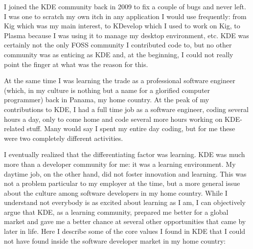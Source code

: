 

\noindent{}I joined the KDE community back in 2009 to fix a couple of bugs and
never left. I was one to scratch my own itch in any application I
would use frequently: from Kig which was my main interest, to KDevelop
which I used to work on Kig, to Plasma because I was using it to
manage my desktop environment, etc. KDE was certainly not the only
FOSS community I contributed code to, but no other community was as
enticing as KDE and, at the beginning, I could not really point the
finger at what was the reason for this.

At the same time I was learning the trade as a professional software
engineer (which, in my culture is nothing but a name for a glorified
computer programmer) back in Panama, my home country. At the peak of
my contributions to KDE, I had a full time job as a software engineer,
coding several hours a day, only to come home and code several more
hours working on KDE-related stuff. Many would say I spent my entire
day coding, but for me these were two completely different activities.

I eventually realized that the differentiating factor was
learning. KDE was much more than a developer community for me: it was
a learning environment. My daytime job, on the other hand, did not
foster innovation and learning. This was not a problem particular to
my employer at the time, but a more general issue about the culture
among software developers in my home country. While I understand not
everybody is as excited about learning as I am, I can objectively
argue that KDE, as a learning community, prepared me better for a
global market and gave me a better chance at several other
opportunities that came by later in life. Here I describe some of the
core values I found in KDE that I could not have found inside the
software developer market in my home country:

